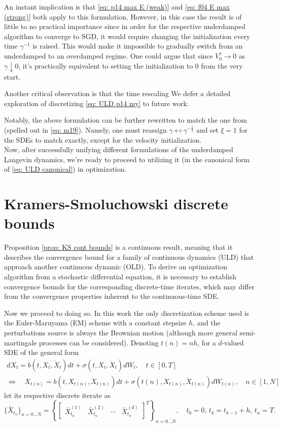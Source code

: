 \documentclass[12pt]{article}
\begin{document}
An instant implication is that \eqref{eq: p14 max E (weak)} and \eqref{eq: f04 E max (strong)} both apply to this formulation.
However, in this case the result is of little to no practical importance since in order for the respective underdamped algorithm to converge to SGD, it would require changing the initialization every time $\gamma^{-1}$ is raised.
This would make it impossible to gradually switch from an underdamped to an overdamped regime.
One could argue that since $V_0^\gamma\to 0$ as $\gamma\downarrow 0$, it's practically equivalent to setting the initialization to $0$ from the very start.

Another critical observation is that the time rescaling
We defer a detailed exploration of discretizing \eqref{eq: ULD p14 my} to future work.

Notably, the above formulation can be further rewritten to match the one from \cite{m19} (spelled out in  \eqref{eq: m19}).
Namely, one must reassign $\gamma \mapsfrom \gamma^{-\frac{1}{2}}$ and set $\xi=1$ for the SDEs to match exactly, except for the velocity initialization.\\

Now, after successfully unifying different formulations of the underdamped Langevin dynamics, we're ready to proceed to utilizing it (in the canonical form of \eqref{eq: ULD canonical}) in optimization.

\section{Kramers-Smoluchowski discrete bounds}

Proposition \ref{prop: KS cont bounds} is a continuous result, meaning that it describes the convergence bound for a family of continuous dynamics (ULD) that approach another continuous dynamic (OLD).
To derive an optimization algorithm from a stochastic differential equation, it is necessary to establish convergence bounds for the corresponding discrete-time iterates, which may differ from the convergence properties inherent to the continuous-time SDE.

Now we proceed to doing so.
In this work the only discretization scheme used is the Euler-Maruyama (EM) scheme with a constant stepsize $h$, and the perturbations source is always the Brownian motion (although more general semi-martingale processes can be considered).
Denoting $t(n)=nh$, for a $d$-valued SDE of the general form
\begin{gather}
    \label{eq: SDE of a general form}
    dX_t = b(t, X_t, \dot{X}_t)dt + \sigma(t, X_t, \dot{X}_t)dW_t,\quad t\in[0, T]\\
    \Longleftrightarrow\quad X_{t(n)} = b(t, X_{t(n)}, \dot{X}_{t(n)})dt + \sigma(t(n), X_{t(n)}, \dot{X}_{t(n)})dW_{t(n)},\quad n\in[1, N]\nonumber
\end{gather}
let its respective discrete iterate as
\[
\{\bar{X}_{t_n}\}_{n=\overline{0...N}}=\left\{\begin{bmatrix}
    \bar{X}_{t_n}^{(1)} & \bar{X}_{t_n}^{(2)} & \cdots & \bar{X}_{t_n}^{(d)}
\end{bmatrix}^T\right\}_{n=\overline{0...N}},\quad t_0=0,\,t_k = t_{k-1}+h,\,t_n=T.
\]
\end{document}
